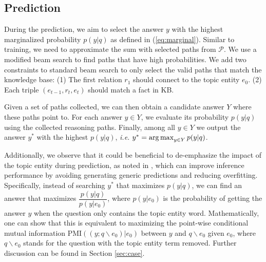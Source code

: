\subsection{Prediction} \label{sec:pmi}

During the prediction, we aim to select the answer $y$ with the highest marginalized probability $p(y|q)$ as defined in (\ref{eq:marginal}). Similar to training, we need to approximate the sum with selected paths from $\mathcal{P}$. We use a modified beam search to find paths that have high probabilities. We add two constraints to standard beam search to only select the valid paths that match the knowledge base: (1) The first relation $r_1$ should connect to the topic entity $e_0$. (2) Each triple $(e_{t-1},r_t,e_t)$ should match a fact in KB.

Given a set of paths collected, we can then obtain a candidate answer $Y$ where these paths point to. For each answer $y \in Y$, we evaluate its probability $p(y|q)$ using the collected reasoning paths. Finally, among all $y \in Y$ we output the answer $y^*$ with the highest $p(y|q)$, \emph{i.e.} $y^*=\operatorname*{arg\,max}_{y \in Y}p(y|q)$.

Additionally, we observe that it could be beneficial to de-emphasize the impact of the topic entity during prediction, as noted in \cite{DBLP:conf/naacl/LiGBGD16}, which can improve inference performance by avoiding generating generic predictions and reducing overfitting. Specifically, instead of searching $y^*$ that maximizes $p(y|q)$, we can find an answer that maximizes $\dfrac{p(y|q)}{p(y|e_0)}$, where $p(y|e_0)$ is the probability of getting the answer $y$ when the question only contains the topic entity word. Mathematically, one can show that this is equivalent to maximizing the point-wise conditional mutual information PMI$((y;q\backslash e_0)|e_0)$ between $y$ and $q\backslash e_0$ given $e_0$, where $q\backslash e_0$ stands for the question with the topic entity term removed. Further discussion can be found in Section \ref{sec:case}.



